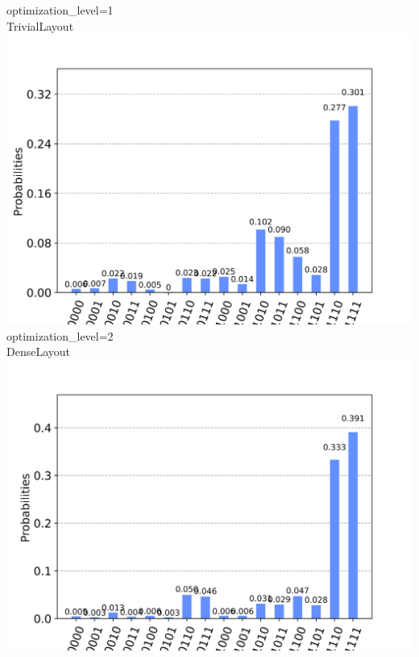 \documentclass[aspectratio=169,11pt,hyperref={colorlinks=true}]{beamer}
\begin{document}
\begin{frame}
    \begin{columns}
            \centering
            optimization\_level=1\\
            TrivialLayout\\
            \includegraphics[width=\linewidth, height=.4\textheight, keepaspectratio]{layout_1_results.png}\\
            optimization\_level=2\\
            DenseLayout\\
        \includegraphics[width=\linewidth, height=.4\textheight, keepaspectratio]{layout_2_results.png}


\end{columns}
\end{frame}
\end{document}
